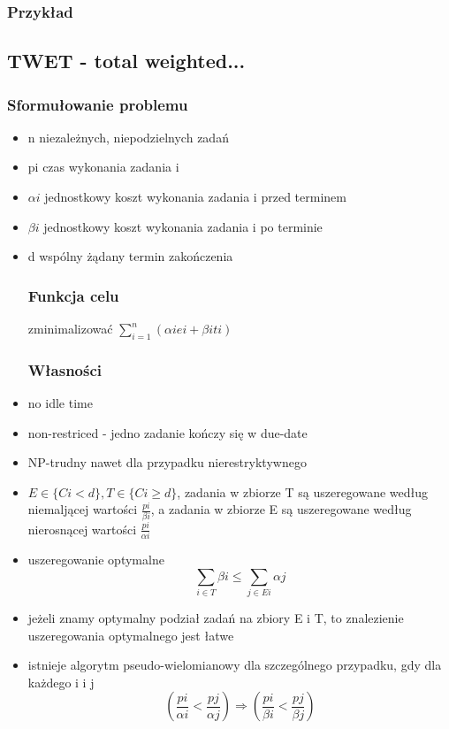 \documentclass[12pt,a4paper]{article}
\begin{document}
\subsubsection{Przykład}
\subsection{TWET - total weighted...}
\subsubsection{Sformułowanie problemu}
\begin{itemize}
\item n niezależnych, niepodzielnych zadań
\item pi czas wykonania zadania i
\item $\alpha i$ jednostkowy koszt wykonania zadania i przed terminem
\item $\beta i$ jednostkowy koszt wykonania zadania i po terminie
\item d wspólny żądany termin zakończenia

\subsubsection{Funkcja celu}
zminimalizować $\sum\limits_{i=1}^{n}(\alpha i ei + \beta iti)$
\subsubsection{Własności}
\item no idle time
\item non-restriced - jedno zadanie kończy się w due-date
\item NP-trudny nawet dla przypadku nierestryktywnego
\item $E \in \{ Ci<d \}, T \in\{Ci\geq d\}$, zadania w zbiorze T są uszeregowane według niemaljącej wartości $\frac{pi}{\beta i}$, a zadania w zbiorze E są uszeregowane według nierosnącej wartości $\frac{pi}{\alpha i}$
\item uszeregowanie optymalne \begin{equation}
\sum\limits_{i\in T} \beta i \leq \sum\limits_{j \in Ei} \alpha j
\end{equation}
\item jeżeli znamy optymalny podział zadań na zbiory E i T, to znalezienie uszeregowania optymalnego jest łatwe
\item istnieje algorytm pseudo-wielomianowy dla szczególnego przypadku, gdy dla każdego i i j \begin{equation}
(\frac{pi}{\alpha i} < \frac{pj}{\alpha j}) \Rightarrow (\frac{pi}{\beta i} < \frac{pj}{\beta j})
\end{equation}
\end{itemize}
\end{document}
